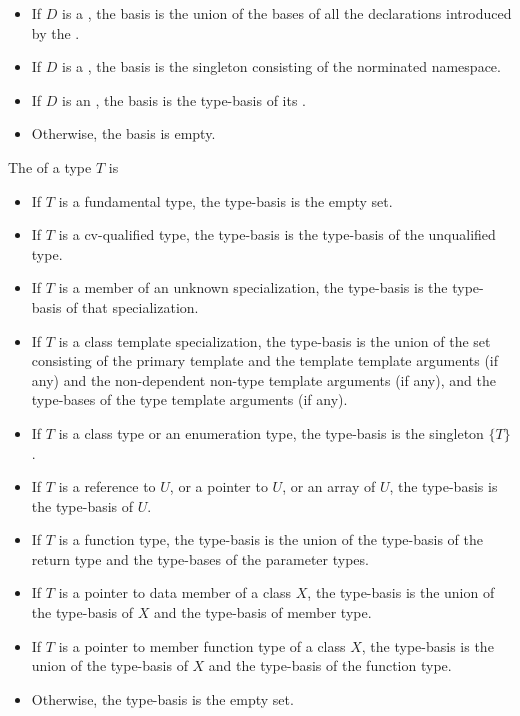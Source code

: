 \begin{std.txt}
\begin{itemize}
    \item If $D$ is a , the basis is the union
    of the bases of all the declarations introduced by
    the .

    \item If $D$ is a , the basis is the
     singleton consisting of the norminated namespace.

    \item If $D$ is an , the basis is the type-basis of
    its .

    \item Otherwise, the basis is empty.
  \end{itemize}

  The  of a type $T$ is
  \begin{itemize}
    \item If $T$ is a fundamental type, the type-basis is the empty set.
    \item If $T$ is a cv-qualified type, the type-basis is the type-basis of
    the unqualified type.
    \item If $T$ is a member of an unknown specialization, the type-basis
    is the type-basis of that specialization.
    \item If $T$ is a class template specialization, the type-basis
    is the union of the set consisting of the primary template and the
    template template arguments (if any) and the non-dependent non-type
    template arguments (if any), and the type-bases of the type 
    template arguments (if any).
    \item If $T$ is a class type or an enumeration type, 
    the type-basis is the singleton $\{ T \}$.
    \item If $T$ is a reference to $U$, or a pointer to $U$, or an array of $U$, the
    type-basis is the type-basis of $U$.
    \item If $T$ is a function type, the type-basis is the union of the
    type-basis of the return type and the type-bases of the parameter types.
    \item If $T$ is a pointer to data member of a class $X$, the type-basis is
    the union of the type-basis of $X$ and the type-basis of member type.
    \item If $T$ is a pointer to member function type of a class $X$, the
    type-basis is the union of the type-basis of $X$ and the type-basis of
    the function type.
    \item Otherwise, the type-basis is the empty set.
  \end{itemize}


\end{std.txt}
